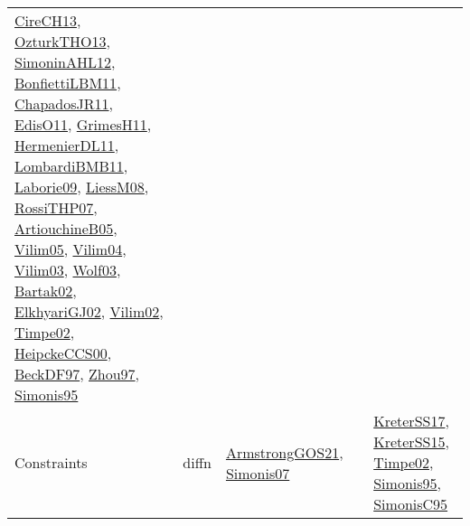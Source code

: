 {\begin{longtable}{llp{6cm}p{6cm}p{6cm}}
\href{papers/CireCH13.pdf}{CireCH13}\cite{CireCH13}, \href{articles/OzturkTHO13.pdf}{OzturkTHO13}\cite{OzturkTHO13}, \href{papers/SimoninAHL12.pdf}{SimoninAHL12}\cite{SimoninAHL12}, \href{papers/BonfiettiLBM11.pdf}{BonfiettiLBM11}\cite{BonfiettiLBM11}, \href{papers/ChapadosJR11.pdf}{ChapadosJR11}\cite{ChapadosJR11}, \href{papers/EdisO11.pdf}{EdisO11}\cite{EdisO11}, \href{papers/GrimesH11.pdf}{GrimesH11}\cite{GrimesH11}, \href{papers/HermenierDL11.pdf}{HermenierDL11}\cite{HermenierDL11}, \href{papers/LombardiBMB11.pdf}{LombardiBMB11}\cite{LombardiBMB11}, \href{papers/Laborie09.pdf}{Laborie09}\cite{Laborie09}, \href{articles/LiessM08.pdf}{LiessM08}\cite{LiessM08}, \href{papers/RossiTHP07.pdf}{RossiTHP07}\cite{RossiTHP07}, \href{papers/ArtiouchineB05.pdf}{ArtiouchineB05}\cite{ArtiouchineB05}, \href{papers/Vilim05.pdf}{Vilim05}\cite{Vilim05}, \href{papers/Vilim04.pdf}{Vilim04}\cite{Vilim04}, \href{papers/Vilim03.pdf}{Vilim03}\cite{Vilim03}, \href{papers/Wolf03.pdf}{Wolf03}\cite{Wolf03}, \href{papers/Bartak02.pdf}{Bartak02}\cite{Bartak02}, \href{papers/ElkhyariGJ02.pdf}{ElkhyariGJ02}\cite{ElkhyariGJ02}, \href{papers/Vilim02.pdf}{Vilim02}\cite{Vilim02}, \href{articles/Timpe02.pdf}{Timpe02}\cite{Timpe02}, \href{articles/HeipckeCCS00.pdf}{HeipckeCCS00}\cite{HeipckeCCS00}, \href{papers/BeckDF97.pdf}{BeckDF97}\cite{BeckDF97}, \href{articles/Zhou97.pdf}{Zhou97}\cite{Zhou97}, \href{papers/Simonis95.pdf}{Simonis95}\cite{Simonis95}\\
Constraints & diffn & \href{papers/ArmstrongGOS21.pdf}{ArmstrongGOS21}\cite{ArmstrongGOS21}, \href{articles/Simonis07.pdf}{Simonis07}\cite{Simonis07} &  & \href{articles/KreterSS17.pdf}{KreterSS17}\cite{KreterSS17}, \href{papers/KreterSS15.pdf}{KreterSS15}\cite{KreterSS15}, \href{articles/Timpe02.pdf}{Timpe02}\cite{Timpe02}, \href{papers/Simonis95.pdf}{Simonis95}\cite{Simonis95}, \href{papers/SimonisC95.pdf}{SimonisC95}\cite{SimonisC95}\\

\end{longtable}}
